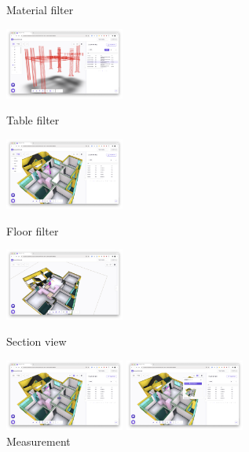 \begin{itemize}[label=]
\begin{itemize}[label=]
\begin{figure}[!ht]
\begin{fullwidth}
{					            \caption*{Material filter}
				            }\qquad
				            \parbox{0.35\textwidth}{
					            \centering
					            \includegraphics[width=0.35\textwidth]{images/builderhub-curation-filter-table.png}
					            \caption*{Table filter}
				            }
				            \parbox{0.35\textwidth}{
					            \centering
					            \includegraphics[width=0.35\textwidth]{images/builderhub-curation-filter-floor.png}
					            \caption*{Floor filter}
				            }\qquad
				            \parbox{0.35\textwidth}{
					            \centering
					            \includegraphics[width=0.35\textwidth]{images/builderhub-curation-section-view.png}
					            \caption*{Section view}
				            }\qquad
				            \parbox{0.35\textwidth}{
					            \centering
					            \includegraphics[width=0.35\textwidth]{images/builderhub-curation-measurement.png}
					            \caption*{Measurement}
				            }\qquad
				            \parbox{0.35\textwidth}{
					            \centering
					            \includegraphics[width=0.35\textwidth]{images/builderhub-curation-screenshot.png}
}
\end{fullwidth}
\end{figure}
\end{itemize}
\end{itemize}
